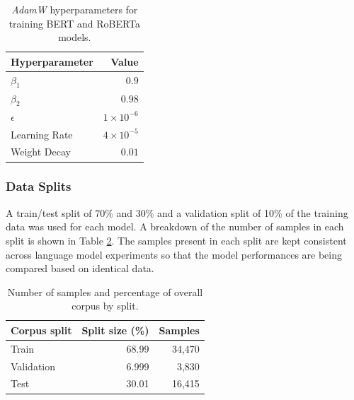 \documentclass[12pt]{article}
\begin{document}
\begin{table}[!t]
    \centering
    \begin{tabular}{l r}
        \toprule
        Hyperparameter & Value              \\
        \midrule
        $\beta_1$      & $0.9$              \\
        $\beta_2$      & $0.98$             \\
        $\epsilon$     & $1 \times 10^{-6}$ \\
        Learning Rate  & $4 \times 10^{-5}$ \\
        Weight Decay   & $0.01$             \\
        \bottomrule
    \end{tabular}
    \caption{\textit{AdamW} hyperparameters for training BERT and RoBERTa models.}
    \label{tab:optim_params}
\end{table}

\subsubsection{Data Splits}
A train/test split of 70\% and 30\% and a validation split of 10\% of the training data was used for each model. A breakdown of the number of samples
in each split is shown in Table \ref{tab:corpus_splits}. The samples present in each split are kept consistent across language model experiments so
that the model performances are being compared based on identical data.

\begin{table}[!t]
    \centering
    \begin{tabular}{l r r}
        \toprule
        Corpus split & Split size (\%) & Samples \\
        \midrule
        Train        & 68.99           & 34,470  \\
        Validation   & 6.999           & 3,830   \\
        Test         & 30.01           & 16,415  \\
        \bottomrule
    \end{tabular}
    \caption{Number of samples and percentage of overall corpus by split.}
    \label{tab:corpus_splits}
\end{table}
\end{document}
